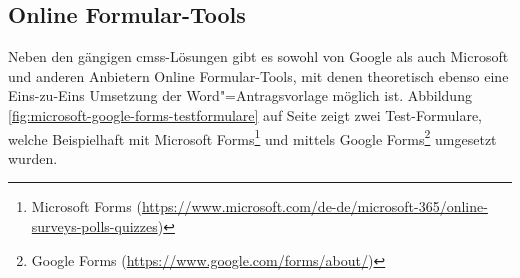 \documentclass[a4paper,12pt,twoside]{scrreprt}
\begin{document}
\subsection{Online Formular-Tools}
\label{sub-sec:formular-tools}

Neben den gängigen \acp{cms}-Lösungen gibt es sowohl von Google als auch Microsoft und anderen Anbietern Online Formular-Tools, mit denen theoretisch ebenso eine Eins-zu-Eins Umsetzung der Word"=Antragsvorlage möglich ist. Abbildung \ref{fig:microsoft-google-forms-testformulare} auf Seite \pageref{fig:microsoft-google-forms-testformulare} zeigt zwei Test-Formulare, welche Beispielhaft mit Microsoft Forms\footnote{Microsoft Forms (\url{https://www.microsoft.com/de-de/microsoft-365/online-surveys-polls-quizzes})} und mittels Google Forms\footnote{Google Forms (\url{https://www.google.com/forms/about/})} umgesetzt wurden.
\end{document}
